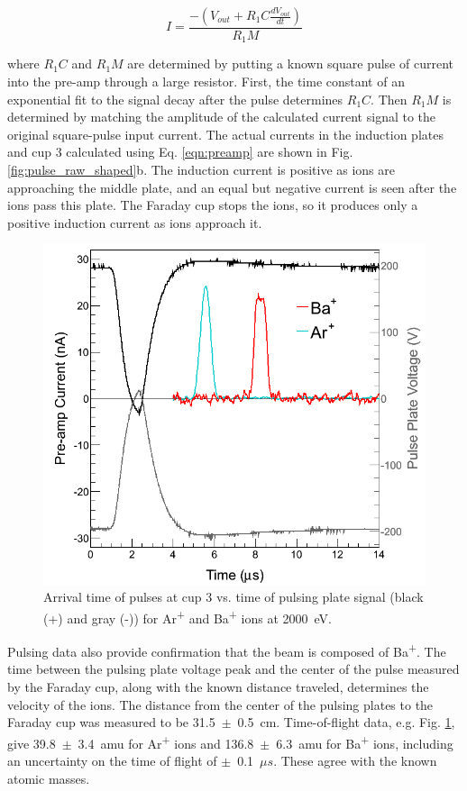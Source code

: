 \begin{equation}
I = \frac{-(V_{out} + R_{1} C \frac{dV_{out}}{dt})}{R_{1} M}
\label{eqn:preamp}
\end{equation}

\noindent
where $R_{1} C$ and $R_{1} M$ are determined by putting a known square pulse of current into the pre-amp through a large resistor.  First, the time constant of an exponential fit to the signal decay after the pulse determines $R_{1} C$.  Then $R_{1} M$ is determined by matching the amplitude of the calculated current signal to the original square-pulse input current.  The actual currents in the induction plates and cup 3 calculated using Eq. \ref{eqn:preamp} are shown in Fig. \ref{fig:pulse_raw_shaped}b.  The induction current is positive as ions are approaching the middle plate, and an equal but negative current is seen after the ions pass this plate.  The Faraday cup stops the ions, so it produces only a positive induction current as ions approach it.

\begin{figure}[h]
        \centering
                \includegraphics[width=.7\textwidth]{figures/pulses_BaAr.png}
                \caption{Arrival time of pulses at cup 3 vs. time of pulsing plate signal (black (+) and gray (-)) for Ar\textsuperscript{+} and Ba\textsuperscript{+} ions at 2000~eV.}
\label{fig:pulses_ArBa}
\end{figure}

Pulsing data also provide confirmation that the beam is composed of Ba\textsuperscript{+}.  The time between the pulsing plate voltage peak and the center of the pulse measured by the Faraday cup, along with the known distance traveled, determines the velocity of the ions.  The distance from the center of the pulsing plates to the Faraday cup was measured to be 31.5~$\pm$~0.5~cm.  Time-of-flight data, e.g. Fig. \ref{fig:pulses_ArBa}, give 39.8~$\pm$~3.4~amu for Ar\textsuperscript{+} ions and 136.8~$\pm$~6.3~amu for Ba\textsuperscript{+} ions, including an uncertainty on the time of flight of $\pm$~0.1~$\mu s$.  These agree with the known atomic masses.

